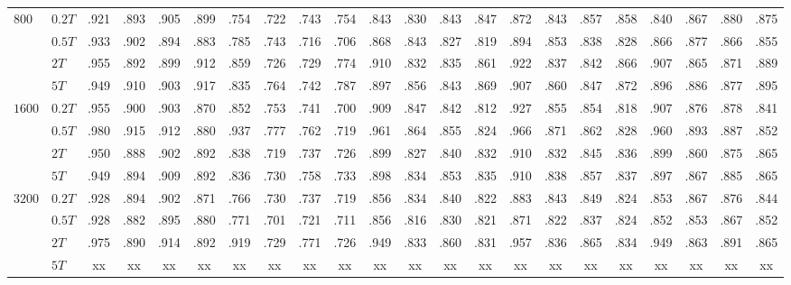 \begin{table}[h]
{\begin{tabular}{llcccccccccccccccccccc}
\hline
$800$ 	& $0.2T$ 	& .921& .893& .905& .899& .754& .722& .743& .754& .843& .830& .843& .847& .872& .843& .857& .858& .840& .867& .880& .875\\
		& $0.5T$ 	& .933& .902& .894& .883& .785& .743& .716& .706& .868& .843& .827& .819& .894& .853& .838& .828& .866& .877& .866& .855\\
		& $2T$ 		& .955& .892& .899& .912& .859& .726& .729& .774& .910& .832& .835& .861& .922& .837& .842& .866& .907& .865& .871& .889\\
		& $5T$ 		& .949& .910& .903& .917& .835& .764& .742& .787& .897& .856& .843& .869& .907& .860& .847& .872& .896& .886& .877& .895\\
\hline
$1600$	& $0.2T$ 	& .955& .900& .903& .870& .852& .753& .741& .700& .909& .847& .842& .812& .927& .855& .854& .818& .907& .876& .878& .841\\
		& $0.5T$ 	& .980& .915& .912& .880& .937& .777& .762& .719& .961& .864& .855& .824& .966& .871& .862& .828& .960& .893& .887& .852\\
		& $2T$ 		& .950& .888& .902& .892& .838& .719& .737& .726& .899& .827& .840& .832& .910& .832& .845& .836& .899& .860& .875& .865\\
		& $5T$ 		& .949& .894& .909& .892& .836& .730& .758& .733& .898& .834& .853& .835& .910& .838& .857& .837& .897& .867& .885& .865\\
\hline
$3200$ 	& $0.2T$ 	& .928& .894& .902& .871& .766& .730& .737& .719& .856& .834& .840& .822& .883& .843& .849& .824& .853& .867& .876& .844\\
		& $0.5T$ 	& .928& .882& .895& .880& .771& .701& .721& .711& .856& .816& .830& .821& .871& .822& .837& .824& .852& .853& .867& .852\\
		& $2T$ 		& .975& .890& .914& .892& .919& .729& .771& .726& .949& .833& .860& .831& .957& .836& .865& .834& .949& .863& .891& .865\\
		& $5T$ 		& xx & xx & xx & xx & xx & xx & xx & xx & xx & xx & xx & xx & xx & xx & xx & xx & xx & xx & xx & xx\\
\hline
\end{tabular}
}
\end{table}

